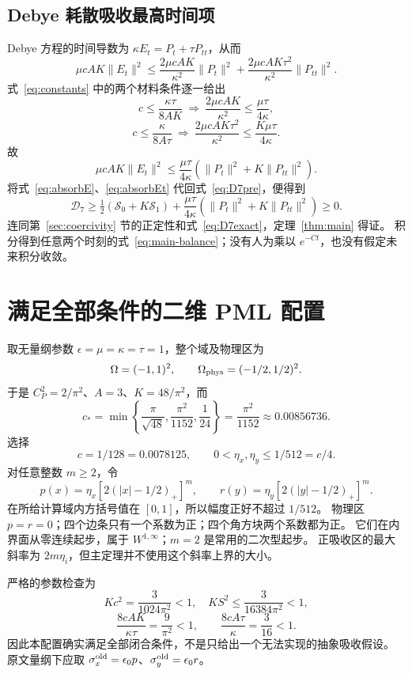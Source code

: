 \documentclass[UTF8,a4paper,11pt,fontset=none]{ctexart}
\numberwithin{equation}{section}
\theoremstyle{definition}
\theoremstyle{definition}
\newcommand{\Om}{\Omega}
\newcommand{\eps}{\epsilon}
\newcommand{\Dcal}{\mathcal D}
\newcommand{\Sc}{\mathscr S}
\begin{document}
\subsection{Debye 耗散吸收最高时间项}
Debye 方程的时间导数为 $\kappa E_t=P_t+\tau P_{tt}$，从而
\[
 \mu cAK\|E_t\|^2
 \le\frac{2\mu cAK}{\kappa^2}\|P_t\|^2
       +\frac{2\mu cAK\tau^2}{\kappa^2}\|P_{tt}\|^2.
\]
式~\eqref{eq:constants} 中的两个材料条件逐一给出
\[
 c\le\frac{\kappa\tau}{8AK}
 \ \Longrightarrow\ \frac{2\mu cAK}{\kappa^2}\le\frac{\mu\tau}{4\kappa},
\]
\[
 c\le\frac{\kappa}{8A\tau}
 \ \Longrightarrow\ \frac{2\mu cAK\tau^2}{\kappa^2}\le\frac{K\mu\tau}{4\kappa}.
\]
故
\begin{equation}\label{eq:absorbEt}
 \mu cAK\|E_t\|^2\le\frac{\mu\tau}{4\kappa}
                 (\|P_t\|^2+K\|P_{tt}\|^2).
\end{equation}
将式~\eqref{eq:absorbE}、\eqref{eq:absorbEt} 代回式~\eqref{eq:D7pre}，便得到
\[
 \Dcal_7\ge\tfrac12(\Sc_0+K\Sc_1)
     +\frac{\mu\tau}{4\kappa}(\|P_t\|^2+K\|P_{tt}\|^2)\ge0.
\]
连同第~\ref{sec:coercivity} 节的正定性和式~\eqref{eq:D7exact}，定理~\ref{thm:main} 得证。
积分得到任意两个时刻的式~\eqref{eq:main-balance}；没有人为乘以 $e^{-Ct}$，也没有假定未来积分收敛。

\section{满足全部条件的二维 PML 配置}
\label{sec:example}

取无量纲参数 $\eps=\mu=\kappa=\tau=1$，整个域及物理区为
\[
 \Om=(-1,1)^2,\qquad\Om_{\rm phys}=(-1/2,1/2)^2.
\]
于是 $C_P^2=2/\pi^2$、$A=3$、$K=48/\pi^2$，而
\[
 c_* =\min\left\{\frac\pi{\sqrt{48}},\frac{\pi^2}{1152},\frac1{24}\right\}
 =\frac{\pi^2}{1152}\approx0.00856736.
\]
选择
\begin{equation}\label{eq:exampleconstants}
 c=1/128=0.0078125,\qquad 0<\eta_x,\eta_y\le1/512=c/4.
\end{equation}
对任意整数 $m\ge2$，令
\begin{equation}\label{eq:profiles}
 \boxed{p(x)=\eta_x[2(|x|-1/2)_+]^m,\qquad
 r(y)=\eta_y[2(|y|-1/2)_+]^m.}
\end{equation}
在所给计算域内方括号值在 $[0,1]$，所以幅度正好不超过 $1/512$。
物理区 $p=r=0$；四个边条只有一个系数为正；四个角方块两个系数都为正。
它们在内界面从零连续起步，属于 $W^{1,\infty}$；$m=2$ 是常用的二次型起步。
正吸收区的最大斜率为 $2m\eta_i$，但主定理并不使用这个斜率上界的大小。

严格的参数检查为
\[
 Kc^2=\frac{3}{1024\pi^2}<1,\quad KS^2\le\frac{3}{16384\pi^2}<1,
\]
\[
 \frac{8cAK}{\kappa\tau}=\frac9{\pi^2}<1,\qquad
 \frac{8cA\tau}{\kappa}=\frac3{16}<1.
\]
因此本配置确实满足全部闭合条件，不是只给出一个无法实现的抽象吸收假设。
原文量纲下应取 $\sigma_x^{\rm old}=\eps_0p$、$\sigma_y^{\rm old}=\eps_0r$。
\end{document}
